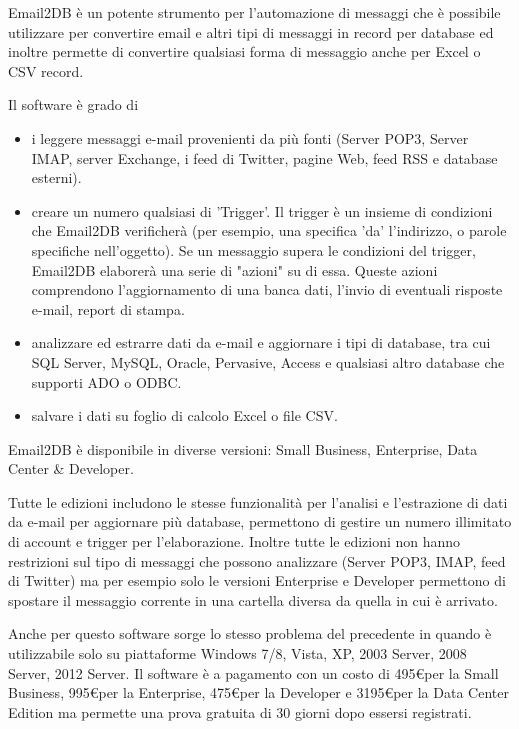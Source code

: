 Email2DB è un potente strumento per  l'automazione di messaggi che è possibile utilizzare per convertire  email e altri tipi di messaggi in record per database ed inoltre permette di convertire qualsiasi forma di messaggio  anche per Excel o CSV record.\\
\linebreak

Il software è grado di 
\begin{itemize}
\item i leggere messaggi e-mail provenienti da più fonti (Server POP3, Server IMAP, server Exchange, i feed di Twitter, pagine Web, feed RSS e database esterni). 
\item creare un numero qualsiasi di 'Trigger'. Il trigger è un insieme di condizioni che Email2DB verificherà (per esempio, una specifica 'da' l'indirizzo, o parole specifiche nell'oggetto). Se un messaggio supera le condizioni del trigger, Email2DB elaborerà una serie di "azioni" su di essa. Queste azioni comprendono l'aggiornamento di una banca dati, l'invio di eventuali risposte e-mail, report di stampa.
\item analizzare ed estrarre dati da e-mail e aggiornare i tipi di database, tra cui SQL Server, MySQL, Oracle, Pervasive, Access e qualsiasi altro database che supporti ADO o ODBC. 
 \item salvare i dati su foglio di calcolo Excel o file CSV.
\end{itemize}

Email2DB è disponibile in diverse versioni: Small Business, Enterprise, Data Center \& Developer. 

Tutte le edizioni includono le stesse funzionalità per l'analisi e l'estrazione di dati da e-mail per aggiornare più database, permettono di gestire un numero illimitato di account e trigger per l'elaborazione. Inoltre tutte le edizioni non hanno restrizioni sul tipo di messaggi che possono analizzare (Server POP3, IMAP, feed di Twitter) ma per esempio solo le versioni Enterprise e Developer permettono di spostare il messaggio corrente in una cartella diversa da quella in cui è arrivato.
\linebreak

Anche per questo software sorge lo stesso problema del precedente in quando è utilizzabile solo su piattaforme Windows 7/8, Vista, XP, 2003 Server, 2008 Server, 2012 Server. Il software è a pagamento con un costo di 495\euro per la Small Business, 995\euro per la Enterprise, 475\euro per la Developer e 3195\euro per la Data Center Edition ma permette una prova gratuita di 30 giorni dopo essersi registrati.